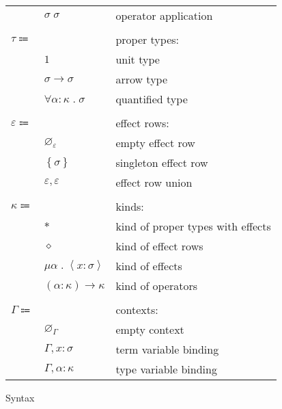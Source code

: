 \documentclass[12pt]{article}
\newcommand\anno[2]{#1 : #2} %
\newcommand\parens[1]{\left( #1 \right)} %
\newcommand\evar{x}
\newcommand\type{\sigma}
\newcommand\tvar{\alpha}
\newcommand\tapp[2]{#1 \; #2} %
\newcommand\properType{\tau}
\newcommand\ptunit{1}
\newcommand\ptarrow[2]{#1 \rightarrow #2} %
\newcommand\ptforall[2]{\forall #1 \; . \; #2} %
\newcommand\row{\varepsilon}
\newcommand\rempty{\varnothing_{\row}}
\newcommand\rsingleton[1]{\left\{ #1 \right\}}
\newcommand\runion[2]{#1, #2}
\newcommand\kind{\kappa}
\newcommand\ktype{\ast}
\newcommand\krow{\diamond} %
\newcommand\keffect[3]{\mu #1 \; . \; \left\langle\anno{#2}{#3}\right\rangle} %
\newcommand\karrow[2]{\parens{#1} \rightarrow #2} %
\newcommand\context{\Gamma}
\newcommand\cempty{\varnothing_{\context}}
\newcommand\ceextend[2]{#1, #2}
\newcommand\csextend[2]{#1, #2}
\begin{document}
\begin{figure}
\begin{mdframed}[backgroundcolor=none]
\begin{center}
\begin{tabular}{l l l}
          & \color{red} $\tapp{\type}{\type}$ & \color{red} operator application \\
          \\
          $\properType \Coloneqq$ & & proper types: \\
          & \color{blue} $\ptunit$ & \color{blue} unit type \\
          & $\ptarrow{\type}{\type}$ & arrow type \\
          & \color{red} $\ptforall{\anno{\tvar}{\kind}}{\type}$ & \color{red} quantified type \\
          \\
          $\row \Coloneqq$ & & effect rows: \\
          & $\rempty$ & empty effect row \\
          & $\rsingleton{\type}$ & singleton effect row \\
          & $\runion{\row}{\row}$ & effect row union \\
          \\
          $\kind \Coloneqq $ & & kinds: \\
          & $\ktype$ & kind of proper types with effects \\
          & $\krow$ & kind of effect rows \\
          & $\keffect{\tvar}{\evar}{\type}$ & kind of effects \\
          & \color{red} $\karrow{\anno{\tvar}{\kind}}{\kind}$ & \color{red} kind of operators \\
          \\
          $\context \Coloneqq$ & & contexts: \\
          & $\cempty$ & empty context \\
          & $\ceextend{\context}{\anno{\evar}{\type}}$ & term variable binding \\
          & $\csextend{\context}{\anno{\tvar}{\kind}}$ & type variable binding \\
        \end{tabular}
      \end{center}

      \caption{Syntax}\label{fig:syntax}
    \end{mdframed}
  \end{figure}
\end{document}
